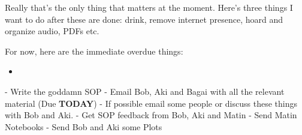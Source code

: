 \noindent {}

Really that's the only thing that matters at the moment. Here's three things I want to do after these are done: drink, remove internet presence, hoard and organize audio, PDFs etc.

For now, here are the immediate overdue things:
\begin{itemize}
    \item 
\end{itemize}
- Write the goddamn SOP
- Email Bob, Aki and Bagai with all the relevant material (Due \textbf{TODAY})
- If possible email some people or discuss these things with Bob and Aki. 
- Get SOP feedback from Bob, Aki and Matin
- Send Matin Notebooks
- Send Bob and Aki some Plots